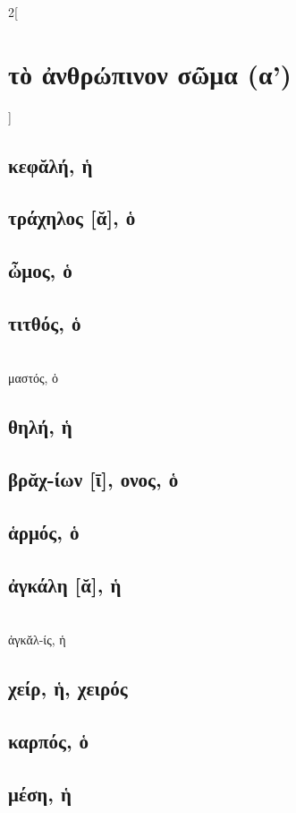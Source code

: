 \documentclass{book}
\begin{document}
\begin{multicols}{2}[\section{τὸ ἀνθρώπινον σῶμα (α')}]
\subsection{κεφᾰλή, ἡ} %
\subsection{τράχηλος [ᾰ], ὁ}
\subsection{ὦμος, ὁ}          
\subsection{τιτθός, ὁ}                ~\\
μαστός, ὁ  
\subsection{θηλή, ἡ}
\subsection{βρᾰχ-ίων [ῑ], ονος, ὁ}
\subsection{ἁρμός, ὁ}
\subsection{ἀγκάλη [ᾰ], ἡ}   ~\\
ἀγκᾰλ-ίς, ἡ 
\subsection{χείρ, ἡ, χειρός}
\subsection{καρπός, ὁ}
\subsection{μέση, ἡ}

\end{multicols}
\end{document}
